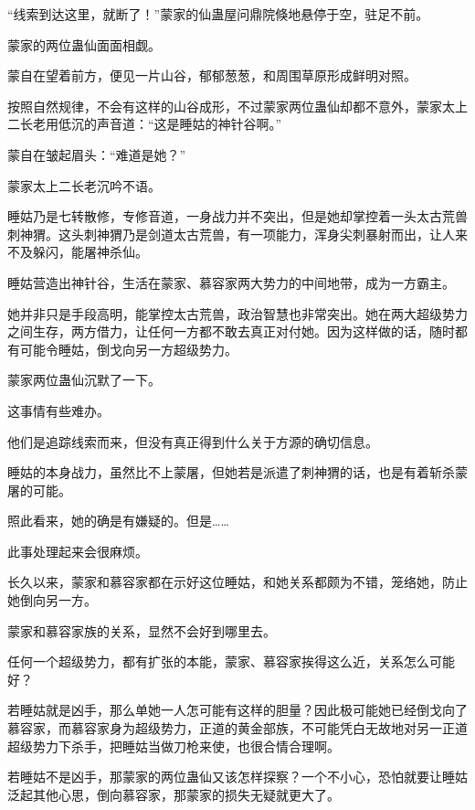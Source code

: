 
\begin{this_body}

“线索到达这里，就断了！”蒙家的仙蛊屋问鼎院倏地悬停于空，驻足不前。

蒙家的两位蛊仙面面相觑。

蒙自在望着前方，便见一片山谷，郁郁葱葱，和周围草原形成鲜明对照。

按照自然规律，不会有这样的山谷成形，不过蒙家两位蛊仙却都不意外，蒙家太上二长老用低沉的声音道：“这是睡姑的神针谷啊。”

蒙自在皱起眉头：“难道是她？”

蒙家太上二长老沉吟不语。

睡姑乃是七转散修，专修音道，一身战力并不突出，但是她却掌控着一头太古荒兽刺神猬。这头刺神猬乃是剑道太古荒兽，有一项能力，浑身尖刺暴射而出，让人来不及躲闪，能屠神杀仙。

睡姑营造出神针谷，生活在蒙家、慕容家两大势力的中间地带，成为一方霸主。

她并非只是手段高明，能掌控太古荒兽，政治智慧也非常突出。她在两大超级势力之间生存，两方借力，让任何一方都不敢去真正对付她。因为这样做的话，随时都有可能令睡姑，倒戈向另一方超级势力。

蒙家两位蛊仙沉默了一下。

这事情有些难办。

他们是追踪线索而来，但没有真正得到什么关于方源的确切信息。

睡姑的本身战力，虽然比不上蒙屠，但她若是派遣了刺神猬的话，也是有着斩杀蒙屠的可能。

照此看来，她的确是有嫌疑的。但是……

此事处理起来会很麻烦。

长久以来，蒙家和慕容家都在示好这位睡姑，和她关系都颇为不错，笼络她，防止她倒向另一方。

蒙家和慕容家族的关系，显然不会好到哪里去。

任何一个超级势力，都有扩张的本能，蒙家、慕容家挨得这么近，关系怎么可能好？

若睡姑就是凶手，那么单她一人怎可能有这样的胆量？因此极可能她已经倒戈向了慕容家，而慕容家身为超级势力，正道的黄金部族，不可能凭白无故地对另一正道超级势力下杀手，把睡姑当做刀枪来使，也很合情合理啊。

若睡姑不是凶手，那蒙家的两位蛊仙又该怎样探察？一个不小心，恐怕就要让睡姑泛起其他心思，倒向慕容家，那蒙家的损失无疑就更大了。


\end{this_body}
